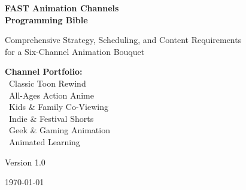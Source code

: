 \documentclass[12pt,letterpaper,twoside]{report}
\begin{document}
\begin{titlepage}
    \centering
    \vspace*{2cm}
    
    {\Huge\bfseries\color{primaryblue} FAST Animation Channels\\[0.5cm] Programming Bible}
    
    \vspace{1cm}
    
    {\Large\color{secondaryblue} Comprehensive Strategy, Scheduling, and Content Requirements\\for a Six-Channel Animation Bouquet}
    
    \vspace{2cm}
    
    \begin{tcolorbox}[
        colback=lightgray,
        colframe=primaryblue,
        width=0.8\textwidth,
        arc=5pt
    ]
    \centering
    \textbf{Channel Portfolio:}\\[0.3cm]
    \textcolor{classictoon}{\textbullet\ Classic Toon Rewind}\\
    \textcolor{animeblue}{\textbullet\ All-Ages Action Anime}\\
    \textcolor{kidspink}{\textbullet\ Kids \& Family Co-Viewing}\\
    \textcolor{indiegreen}{\textbullet\ Indie \& Festival Shorts}\\
    \textcolor{geekpurple}{\textbullet\ Geek \& Gaming Animation}\\
    \textcolor{learningorange}{\textbullet\ Animated Learning}
    \end{tcolorbox}
    
    \vspace{3cm}
    
    {\large Version 1.0}
    
    \vfill
    
    {\large\today}
    
\end{titlepage}


\tableofcontents
\clearpage
\end{document}
